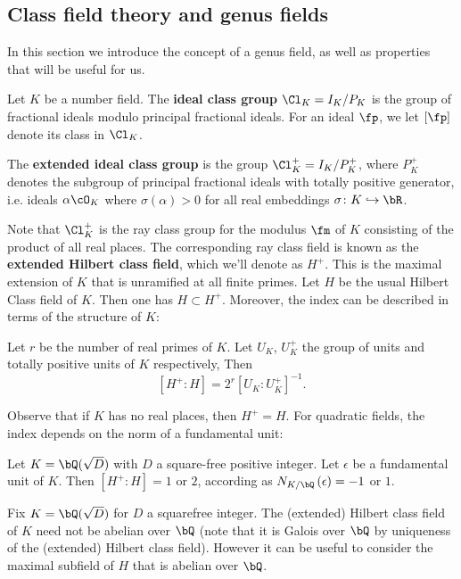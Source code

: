 \subsection{Class field theory and genus fields}

In this section we introduce the concept of a genus field, as well as properties that will be useful for us.

Let $K$ be a number field. The \textbf{ideal class group} $\Cl_K = I_K / P_K$ is the group of fractional ideals modulo principal fractional ideals.
For an ideal $\fp$, we let $[\fp]$ denote its class in $\Cl_K$.

The \textbf{extended ideal class group} is the group $\Cl_K^{+} = I_K / P_K^{+}$, where
$P_K^{+}$ denotes the subgroup of principal fractional ideals with totally positive generator, i.e. ideals $\alpha \cO_K$ where $\sigma(\alpha) > 0$ for all real embeddings $\sigma \colon K \emb \bR$.

Note that $\Cl_K^{+}$ is the ray class group for the modulus $\fm$ of $K$ consisting of the product of all real places. The corresponding ray class field is known as the \textbf{extended Hilbert class field}, which we'll denote as $H^{+}$. This is the maximal extension of $K$ that is unramified at all finite primes. Let $H$ be the usual Hilbert Class field of $K$. Then one has $H \subset H^{+}$. Moreover, the index can be described in terms of the structure of $K$:

\begin{thm}\cite[Chapter VI, Section 3, Theorem 3.1]{Janusz}
    Let $r$ be the number of real primes of $K$. Let $U_K$, $U_K^{+}$ the group of units and totally positive units of $K$ respectively, Then 
    \[ [H^{+} \colon H] = 2^r [U_K \colon U_K^{+}]^{-1} .\]
\end{thm}
Observe that if $K$ has no real places, then $H^{+} = H$. For quadratic fields, the index depends on the norm of a fundamental unit:

\begin{cor}
    Let $K = \bQ(\sqrt{D})$ with $D$ a square-free positive integer. Let $\epsilon$ be a fundamental unit of $K$. Then $[H^{+} \colon H] = 1$ or $2$, according as $N_{K / \bQ}\left(\epsilon\right) = -1$ or $1$. 
\end{cor}


Fix $K = \bQ(\sqrt{D})$ for $D$ a squarefree integer. The (extended) Hilbert class field of $K$ need not be abelian over $\bQ$ (note that it is Galois over $\bQ$ by uniqueness of the (extended) Hilbert class field). However it can be useful to consider the maximal subfield of $H$ that is abelian over $\bQ$. 

